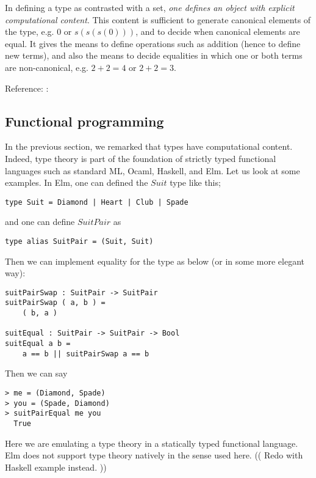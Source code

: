  

 In defining a type as contrasted with a set, \emph{one defines an object  with explicit computational content}.  This content is sufficient to generate canonical elements of the type, e.g. $0$ or $s(s(s(0)))$, and to decide when canonical elements are equal.  It gives the means to define operations such as addition (hence to define new terms), and also the means to decide equalities in which one or both terms are non-canonical, e.g. $2 + 2 = 4$ or $2 + 2 = 3$.  

Reference: \cite{EPB}:


\subsection{Functional programming}

In the previous section, we remarked that types have computational content.  Indeed, type theory is part of the foundation of strictly typed functional languages such as standard ML, Ocaml, Haskell, and Elm.  Let us look at some examples.  In Elm, one can defined the $Suit$ type like this;

\begin{verbatim}
type Suit = Diamond | Heart | Club | Spade
\end{verbatim}

and one can define $SuitPair$ as

\begin{verbatim}
type alias SuitPair = (Suit, Suit)
\end{verbatim}

Then we can implement equality for the  type as below (or in some more elegant way):

\begin{verbatim}
suitPairSwap : SuitPair -> SuitPair
suitPairSwap ( a, b ) =
    ( b, a )

suitEqual : SuitPair -> SuitPair -> Bool
suitEqual a b =
    a == b || suitPairSwap a == b

\end{verbatim}

Then we can say

\begin{verbatim}
> me = (Diamond, Spade)
> you = (Spade, Diamond)
> suitPairEqual me you
  True
\end{verbatim}

Here we are emulating a type theory in a statically typed functional language.  Elm does not support type theory natively in the sense used here.  (( Redo with Haskell example instead. ))

